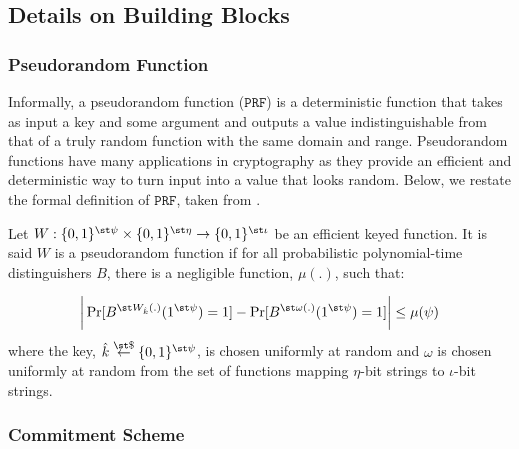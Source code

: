 \subsection{Details on Building Blocks}\label{app:blocks}

\subsubsection{Pseudorandom Function}\label{subsec:PRF}

Informally, a pseudorandom function ($\mathtt{PRF}$) is a deterministic function that takes as input a key and some argument and outputs a value  indistinguishable from that of a truly random function with the same domain and range.  Pseudorandom functions have many applications in cryptography as they provide an efficient and deterministic way to turn  input into a value that looks random. Below, we restate the formal definition of $\mathtt{PRF}$, taken from \cite{DBLP:books/crc/KatzLindell2007}. 

\begin{definition} Let $W:\{0,1\}^{\st\psi}\times \{0,1\}^{\st \eta}\rightarrow \{0,1\}^{\st  \iota}$ be an efficient  keyed function. It is said $W$ is a pseudorandom function if for all probabilistic polynomial-time distinguishers $B$, there is a negligible function, $\mu(.)$, such that:

\begin{equation*}
\bigg | \Pr[B^{\st W_{\hat{k}}(.)}(1^{\st \psi})=1]- \Pr[B^{\st \omega(.)}(1^{\st \psi})=1] \bigg |\leq \mu(\psi)
\end{equation*}
where  the key, $\hat{k}\stackrel{\st\$}\leftarrow\{0,1\}^{\st\psi}$, is chosen uniformly at random and $\omega$ is chosen uniformly at random from the set of functions mapping $\eta$-bit strings to $\iota$-bit strings.
\end{definition}

\subsubsection{Commitment Scheme}\label{subsec:commit}


